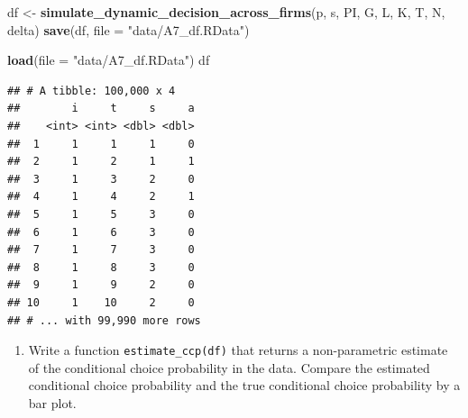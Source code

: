 \documentclass[]{book}
\newenvironment{Shaded}{\begin{snugshade}}{\end{snugshade}}
\newcommand{\KeywordTok}[1]{\textcolor[rgb]{0.13,0.29,0.53}{\textbf{#1}}}
\newcommand{\DataTypeTok}[1]{\textcolor[rgb]{0.13,0.29,0.53}{#1}}
\newcommand{\StringTok}[1]{\textcolor[rgb]{0.31,0.60,0.02}{#1}}
\newcommand{\NormalTok}[1]{#1}
\providecommand{\tightlist}{%
  \setlength{\itemsep}{0pt}\setlength{\parskip}{0pt}}
\begin{document}
\begin{Shaded}
\begin{Highlighting}[]
\NormalTok{df <-}\StringTok{ }\KeywordTok{simulate_dynamic_decision_across_firms}\NormalTok{(p, s, PI, G, L, K, T, N, delta)}
\KeywordTok{save}\NormalTok{(df, }\DataTypeTok{file =} \StringTok{"data/A7_df.RData"}\NormalTok{)}
\end{Highlighting}
\end{Shaded}

\begin{Shaded}
\begin{Highlighting}[]
\KeywordTok{load}\NormalTok{(}\DataTypeTok{file =} \StringTok{"data/A7_df.RData"}\NormalTok{)}
\NormalTok{df}
\end{Highlighting}
\end{Shaded}

\begin{verbatim}
## # A tibble: 100,000 x 4
##        i     t     s     a
##    <int> <int> <dbl> <dbl>
##  1     1     1     1     0
##  2     1     2     1     1
##  3     1     3     2     0
##  4     1     4     2     1
##  5     1     5     3     0
##  6     1     6     3     0
##  7     1     7     3     0
##  8     1     8     3     0
##  9     1     9     2     0
## 10     1    10     2     0
## # ... with 99,990 more rows
\end{verbatim}

\begin{enumerate}
\def\labelenumi{\arabic{enumi}.}
\setcounter{enumi}{7}
\tightlist
\item
  Write a function \texttt{estimate\_ccp(df)} that returns a
  non-parametric estimate of the conditional choice probability in the
  data. Compare the estimated conditional choice probability and the
  true conditional choice probability by a bar plot.
\end{enumerate}
\end{document}
